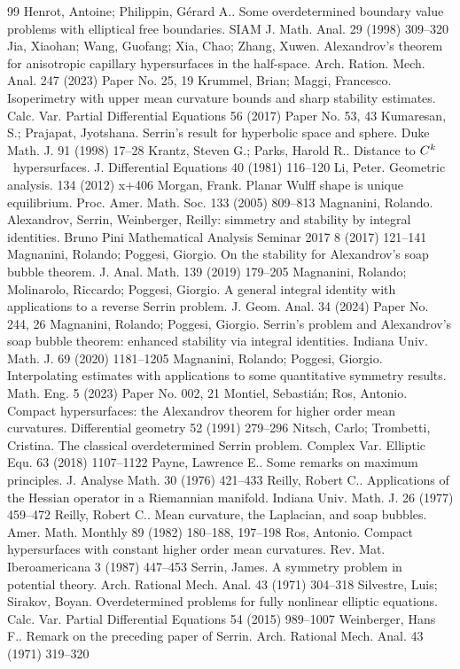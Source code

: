 \documentclass[10pt,a4paper]{amsart}
\numberwithin{equation}{section}
\begin{document}
\begin{thebibliography}{99}
 Henrot, Antoine; Philippin, G\'erard A.. Some overdetermined boundary value problems with elliptical free boundaries. SIAM J. Math. Anal. 29 (1998) 309--320
 Jia, Xiaohan; Wang, Guofang; Xia, Chao; Zhang, Xuwen. Alexandrov's theorem for anisotropic capillary hypersurfaces in the half-space. Arch. Ration. Mech. Anal. 247 (2023) Paper No. 25, 19
 Krummel, Brian; Maggi, Francesco. Isoperimetry with upper mean curvature bounds and sharp stability estimates. Calc. Var. Partial Differential Equations 56 (2017) Paper No. 53, 43
 Kumaresan, S.; Prajapat, Jyotshana. Serrin's result for hyperbolic space and sphere. Duke Math. J. 91 (1998) 17--28
 Krantz, Steven G.; Parks, Harold R.. Distance to {$C\sp{k}$}\ hypersurfaces. J. Differential Equations 40 (1981) 116--120
 Li, Peter. Geometric analysis. 134 (2012) x+406
 Morgan, Frank. Planar {W}ulff shape is unique equilibrium. Proc. Amer. Math. Soc. 133 (2005) 809--813
 Magnanini, Rolando. Alexandrov, {S}errin, {W}einberger, {R}eilly: simmetry and stability by integral identities. Bruno {P}ini {M}athematical {A}nalysis {S}eminar 2017 8 (2017) 121--141
 Magnanini, Rolando; Poggesi, Giorgio. On the stability for {A}lexandrov's soap bubble theorem. J. Anal. Math. 139 (2019) 179--205
 Magnanini, Rolando; Molinarolo, Riccardo; Poggesi, Giorgio. A general integral identity with applications to a reverse {S}errin problem. J. Geom. Anal. 34 (2024) Paper No. 244, 26
 Magnanini, Rolando; Poggesi, Giorgio. Serrin's problem and {A}lexandrov's soap bubble theorem: enhanced stability via integral identities. Indiana Univ. Math. J. 69 (2020) 1181--1205
 Magnanini, Rolando; Poggesi, Giorgio. Interpolating estimates with applications to some quantitative symmetry results. Math. Eng. 5 (2023) Paper No. 002, 21
 Montiel, Sebasti\'an; Ros, Antonio. Compact hypersurfaces: the {A}lexandrov theorem for higher order mean curvatures. Differential geometry 52 (1991) 279--296
 Nitsch, Carlo; Trombetti, Cristina. The classical overdetermined {S}errin problem. Complex Var. Elliptic Equ. 63 (2018) 1107--1122
 Payne, Lawrence E.. Some remarks on maximum principles. J. Analyse Math. 30 (1976) 421--433
 Reilly, Robert C.. Applications of the {H}essian operator in a {R}iemannian manifold. Indiana Univ. Math. J. 26 (1977) 459--472
 Reilly, Robert C.. Mean curvature, the {L}aplacian, and soap bubbles. Amer. Math. Monthly 89 (1982) 180--188, 197--198
 Ros, Antonio. Compact hypersurfaces with constant higher order mean curvatures. Rev. Mat. Iberoamericana 3 (1987) 447--453
 Serrin, James. A symmetry problem in potential theory. Arch. Rational Mech. Anal. 43 (1971) 304--318
 Silvestre, Luis; Sirakov, Boyan. Overdetermined problems for fully nonlinear elliptic equations. Calc. Var. Partial Differential Equations 54 (2015) 989--1007
 Weinberger, Hans F.. Remark on the preceding paper of {S}errin. Arch. Rational Mech. Anal. 43 (1971) 319--320
\end{thebibliography}
\end{document}
